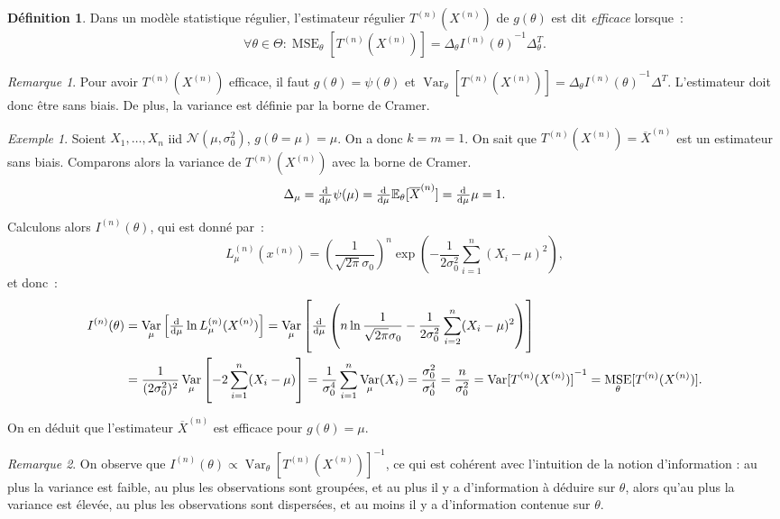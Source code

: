\documentclass{report}
\DeclareMathOperator{\Var}{Var}
\DeclareMathOperator{\MSE}{MSE}
\newcommand{\E}{\mathbb E}
\newcommand{\Xn}{{X^{(n)}}}
\newcommand{\Tn}{{T^{(n)}}}
\newcommand{\TnXn}{{\Tn(\Xn)}}
\theoremstyle{definition}
\newtheorem{déf}[thm]{Définition}
\theoremstyle{remark}
\newtheorem*{rmq}{Remarque}
\newtheorem{ex}{Exemple}[chapter]
\begin{document}
			\begin{déf} Dans un modèle statistique régulier, l'estimateur régulier $\TnXn$ de $g(\theta)$ est dit \textit{efficace} lorsque~:
			\[\forall \theta \in \Theta : \MSE_\theta[\TnXn] = \Delta_\theta{I^{(n)}(\theta)}^{-1}\Delta_\theta^T.\]
			\end{déf}

			\begin{rmq} Pour avoir $\TnXn$ efficace, il faut $g(\theta) = \psi(\theta)$ et $\Var_\theta[\TnXn] = \Delta_\theta{I^{(n)}(\theta)}^{-1}\Delta^T$.
			L'estimateur doit donc être sans biais. De plus, la variance est définie par la borne de Cramer.
			\end{rmq}

			\begin{ex} Soient $X_1, \ldots, X_n$ iid $\mathcal N(\mu, \sigma_0^2)$, $g(\theta = \mu) = \mu$. On a donc $k=m=1$. On sait que $\TnXn = \overline X^{(n)}$
			est un estimateur sans biais. Comparons alors la variance de $\TnXn$ avec la borne de Cramer.
			\[\Delta_\mu = \od {}\mu \psi(\mu) = \od {}\mu\E_\theta[\overline X^{(n)}] = \od {}\mu\mu = 1.\]

			Calculons alors $I^{(n)}(\theta)$, qui est donné par~:
			\[L_\mu^{(n)}(x^{(n)}) = \left(\frac 1{\sqrt {2\pi}\sigma_0}\right)^n\exp\left(-\frac 1{2\sigma_0^2}\sum_{i=1}^n(X_i-\mu)^2\right),\]
			et donc~:
			\begin{align*}
				I^{(n)}(\theta) &= \Var_\mu\left[\od {}\mu \ln L_\mu^{(n)}(X^{(n)})\right]
					= \Var_\mu\left[\od {}\mu\left(n\ln \frac 1{\sqrt {2\pi}\sigma_0} - \frac 1{2\sigma_0^2}\sum_{i=2}^n(X_i-\mu)^2\right)\right] \\
				&=\frac 1{(2\sigma_0^2)^2}\Var_\mu\left[-2\sum_{i=1}^n(X_i-\mu)\right] = \frac 1{\sigma_0^4}\sum_{i=1}^n\Var_\mu(X_i)
					= \frac {\sigma_0^2}{\sigma_0^4} = \frac n{\sigma_0^2} = {\Var[\TnXn]}^{-1} = \MSE_\theta[\TnXn].
			\end{align*}

			On en déduit que l'estimateur $\overline X^{(n)}$ est efficace pour $g(\theta) = \mu$.
			\end{ex}

			\begin{rmq} On observe que $I^{(n)}(\theta) \propto {\Var_\theta[\TnXn]}^{-1}$, ce qui est cohérent avec l'intuition de la notion d'information : au plus
			la variance est faible, au plus les observations sont groupées, et au plus il y a d'information à déduire sur $\theta$, alors qu'au plus la variance est
			élevée, au plus les observations sont dispersées, et au moins il y a d'information contenue sur $\theta$.
			\end{rmq}
\end{document}
